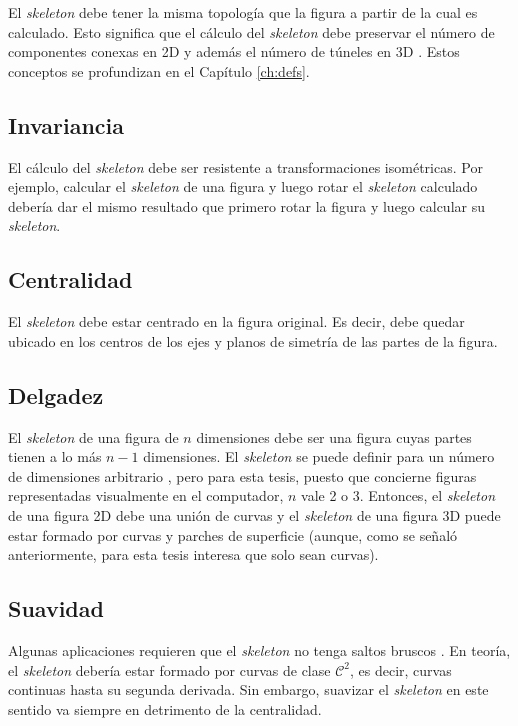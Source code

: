 El \textit{skeleton} debe tener la misma topología que la figura a partir de la cual es calculado. Esto significa que el cálculo del \textit{skeleton} debe preservar el número de componentes conexas en 2D y además el número de túneles en 3D \cite{Lieutier20041029}. Estos conceptos se profundizan en el Capítulo \ref{ch:defs}.

\subsection{Invariancia}

El cálculo del \textit{skeleton} debe ser resistente a transformaciones isométricas. Por ejemplo, calcular el \textit{skeleton} de una figura y luego rotar el \textit{skeleton} calculado debería dar el mismo resultado que primero rotar la figura y luego calcular su \textit{skeleton}.

\subsection{Centralidad}

El \textit{skeleton} debe estar centrado en la figura original. Es decir, debe quedar ubicado en los centros de los ejes y planos de simetría de las partes de la figura.

\subsection{Delgadez}

El \textit{skeleton} de una figura de $n$ dimensiones debe ser una figura cuyas partes tienen a lo más $n-1$ dimensiones. El \textit{skeleton} se puede definir para un número de dimensiones arbitrario \cite{Lieutier20041029}, pero para esta tesis, puesto que concierne figuras representadas visualmente en el computador, $n$ vale 2 o 3. Entonces, el \textit{skeleton} de una figura 2D debe una unión de curvas y el \textit{skeleton} de una figura 3D puede estar formado por curvas y parches de superficie (aunque, como se señaló anteriormente, para esta tesis interesa que solo sean curvas).

\subsection{Suavidad}

Algunas aplicaciones requieren que el \textit{skeleton} no tenga saltos bruscos \cite{wan2002automatic}. En teoría, el \textit{skeleton} debería estar formado por curvas de clase $\mathcal{C}^2$, es decir, curvas continuas hasta su segunda derivada. Sin embargo, suavizar el \textit{skeleton} en este sentido va siempre en detrimento de la centralidad.

